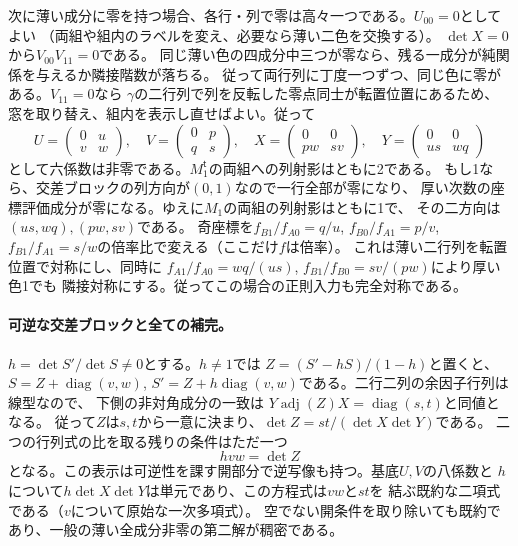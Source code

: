 次に薄い成分に零を持つ場合、各行・列で零は高々一つである。$U_{00}=0$としてよい
（両組や組内のラベルを変え、必要なら薄い二色を交換する）。
$\det X=0$から$V_{00}V_{11}=0$である。
同じ薄い色の四成分中三つが零なら、残る一成分が純関係を与えるか隣接階数が落ちる。
従って両行列に丁度一つずつ、同じ色に零がある。$V_{11}=0$なら
$\gamma$の二行列で列を反転した零点同士が転置位置にあるため、
窓を取り替え、組内を表示し直せばよい。従って
\[
 U=\begin{pmatrix}0&u\\v&w\end{pmatrix},\quad
 V=\begin{pmatrix}0&p\\q&s\end{pmatrix},\quad
 X=\begin{pmatrix}0&0\\pw&sv\end{pmatrix},\quad
 Y=\begin{pmatrix}0&0\\us&wq\end{pmatrix}
\]
として六係数は非零である。$M_1^{\mathsf t}$の両組への列射影はともに2である。
もし1なら、交差ブロックの列方向が$(0,1)$なので一行全部が零になり、
厚い次数の座標評価成分が零になる。ゆえに$M_1$の両組の列射影はともに1で、
その二方向は$(us,wq),(pw,sv)$である。
奇座標を$f_{B1}/f_{A0}=q/u$, $f_{B0}/f_{A1}=p/v$,
$f_{B1}/f_{A1}=s/w$の倍率比で変える（ここだけ$f$は倍率）。
これは薄い二行列を転置位置で対称にし、同時に
$f_{A1}/f_{A0}=wq/(us)$, $f_{B1}/f_{B0}=sv/(pw)$により厚い色1でも
隣接対称にする。従ってこの場合の正則入力も完全対称である。

\paragraph{可逆な交差ブロックと全ての補完。}
$h=\det S'/\det S\ne0$とする。$h\ne1$では
$Z=(S'-hS)/(1-h)$と置くと、$S=Z+\operatorname{diag}(v,w)$,
$S'=Z+h\operatorname{diag}(v,w)$である。二行二列の余因子行列は線型なので、
下側の非対角成分の一致は
$Y\operatorname{adj}(Z)X=\operatorname{diag}(s,t)$と同値となる。
従って$Z$は$s,t$から一意に決まり、$\det Z=st/(\det X\det Y)$である。
二つの行列式の比を取る残りの条件はただ一つ
\[
             h v w=\det Z
\]
となる。この表示は可逆性を課す開部分で逆写像も持つ。基底$U,V$の八係数と
$h$について$h\det X\det Y$は単元であり、この方程式は$vw$と$st$を
結ぶ既約な二項式である（$v$について原始な一次多項式）。
空でない開条件を取り除いても既約であり、一般の薄い全成分非零の第二解が稠密である。

